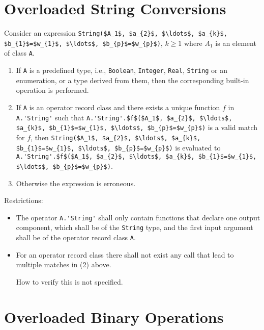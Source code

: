 \section{Overloaded String Conversions}\label{overloaded-string-conversions}

Consider an expression \lstinline!String($A_1$, $a_{2}$, $\ldots$, $a_{k}$, $b_{1}$=$w_{1}$, $\ldots$, $b_{p}$=$w_{p}$)!, $k \geq 1$ where $A_1$ is an element of class \lstinline!A!.

\begin{enumerate}
\item
  If \lstinline!A! is a predefined type, i.e., \lstinline!Boolean!, \lstinline!Integer!, \lstinline!Real!, \lstinline!String! or
  an enumeration, or a type derived from them, then the corresponding
  built-in operation is performed.
\item
  If \lstinline!A! is an operator record class and there exists a unique function
  $f$ in \lstinline!A.'String'! such that
  \lstinline!A.'String'.$f$($A_1$, $a_{2}$, $\ldots$, $a_{k}$, $b_{1}$=$w_{1}$, $\ldots$, $b_{p}$=$w_{p}$)!
  is a valid match for $f$, then
  \lstinline!String($A_1$, $a_{2}$, $\ldots$, $a_{k}$, $b_{1}$=$w_{1}$, $\ldots$, $b_{p}$=$w_{p}$)!
  is evaluated to\\
  \lstinline!A.'String'.$f$($A_1$, $a_{2}$, $\ldots$, $a_{k}$, $b_{1}$=$w_{1}$, $\ldots$, $b_{p}$=$w_{p}$)!.
\item
  Otherwise the expression is erroneous.
\end{enumerate}

Restrictions:
\begin{itemize}
\item
  The operator \lstinline!A.'String'! shall only contain functions that declare one
  output component, which shall be of the \lstinline!String! type, and the first
  input argument shall be of the operator record class \lstinline!A!.
\item
  For an operator record class there shall not exist any call that lead
  to multiple matches in (2) above.
  \begin{nonnormative}
  How to verify this is not specified.
  \end{nonnormative}
\end{itemize}

\section{Overloaded Binary Operations}\label{overloaded-binary-operations}

